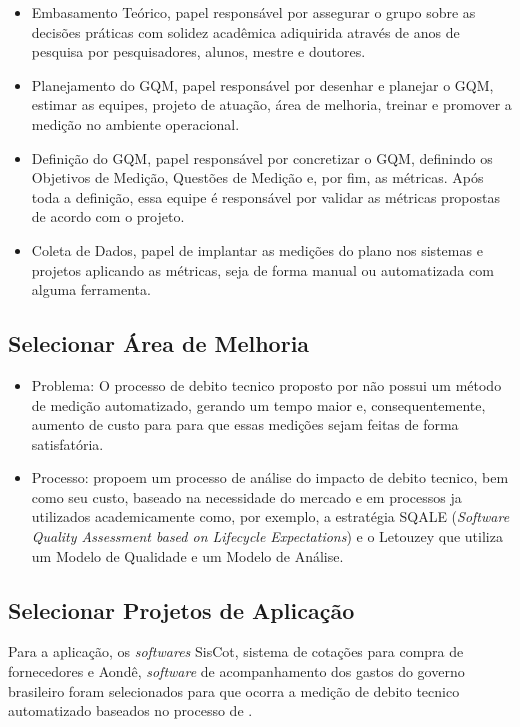 \begin{itemize}
  \item Embasamento Teórico, papel responsável por assegurar o grupo sobre as decisões
  práticas com solidez acadêmica adiquirida através de anos de pesquisa por pesquisadores,
  alunos, mestre e doutores.

  \item Planejamento do GQM, papel responsável por desenhar e planejar o GQM, estimar
  as equipes, projeto de atuação, área de melhoria, treinar e promover a medição
  no ambiente operacional.

  \item Definição do GQM, papel responsável por concretizar o GQM, definindo os
  Objetivos de Medição, Questões de Medição e, por fim, as métricas. Após toda a
  definição, essa equipe é responsável por validar as métricas propostas de acordo
  com o projeto.

  \item Coleta de Dados, papel de implantar as medições do plano nos sistemas e
  projetos aplicando as métricas, seja de forma manual ou automatizada com alguma
  ferramenta.
\end{itemize}

\subsection{Selecionar Área de Melhoria}
\begin{itemize}
  \item Problema: O processo de debito tecnico proposto por  \cite{td} não possui
  um método de medição automatizado, gerando um tempo maior e, consequentemente, aumento de custo
  para para que essas medições sejam feitas de forma satisfatória.

  \item Processo: \cite{td} propoem um processo de análise do impacto de debito tecnico,
  bem como seu custo, baseado na necessidade do mercado e em processos ja utilizados academicamente como,
  por exemplo, a estratégia SQALE (\textit{Software Quality Assessment based on Lifecycle Expectations}) e o
  Letouzey que utiliza um Modelo de Qualidade e um Modelo de Análise.
\end{itemize}

\subsection{Selecionar Projetos de Aplicação}
Para a aplicação, os \textit{softwares} SisCot, sistema de cotações para compra de fornecedores e Aondê, \textit{software}
de acompanhamento dos gastos do governo brasileiro foram selecionados para que ocorra a medição
de debito tecnico automatizado baseados no processo de \cite{td}.

